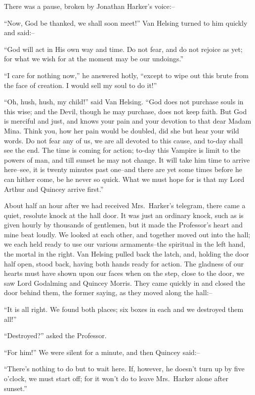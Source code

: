 \documentclass[12pt,openright]{book}
\begin{document}
There was a pause, broken by Jonathan Harker’s voice:–

“Now, God be thanked, we shall soon meet!” Van Helsing turned to him quickly and said:–

“God will act in His own way and time. Do not fear, and do not rejoice as yet; for what we wish for at the moment may be our undoings.”

“I care for nothing now,” he answered hotly, “except to wipe out this brute from the face of creation. I would sell my soul to do it!”

“Oh, hush, hush, my child!” said Van Helsing. “God does not purchase souls in this wise; and the Devil, though he may purchase, does not keep faith. But God is merciful and just, and knows your pain and your devotion to that dear Madam Mina. Think you, how her pain would be doubled, did she but hear your wild words. Do not fear any of us, we are all devoted to this cause, and to-day shall see the end. The time is coming for action; to-day this Vampire is limit to the powers of man, and till sunset he may not change. It will take him time to arrive here–see, it is twenty minutes past one–and there are yet some times before he can hither come, be he never so quick. What we must hope for is that my Lord Arthur and Quincey arrive first.”

About half an hour after we had received Mrs. Harker’s telegram, there came a quiet, resolute knock at the hall door. It was just an ordinary knock, such as is given hourly by thousands of gentlemen, but it made the Professor’s heart and mine beat loudly. We looked at each other, and together moved out into the hall; we each held ready to use our various armaments–the spiritual in the left hand, the mortal in the right. Van Helsing pulled back the latch, and, holding the door half open, stood back, having both hands ready for action. The gladness of our hearts must have shown upon our faces when on the step, close to the door, we saw Lord Godalming and Quincey Morris. They came quickly in and closed the door behind them, the former saying, as they moved along the hall:–

“It is all right. We found both places; six boxes in each and we destroyed them all!”

“Destroyed?” asked the Professor.

“For him!” We were silent for a minute, and then Quincey said:–

“There’s nothing to do but to wait here. If, however, he doesn’t turn up by five o’clock, we must start off; for it won’t do to leave Mrs. Harker alone after sunset.”
\end{document}
